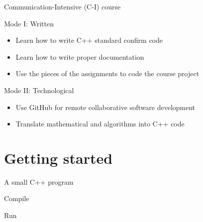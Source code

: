 \documentclass[\classoption]{beamer}
\begin{document}
\begin{frame}{Communication-Intensive (C-I) course}

\begin{block}{Mode I: Written}
\begin{itemize}
\item Learn how to write C++ standard confirm code 
\item Learn how to write proper documentation
\item Use the pieces of the assignments to code the course project
\end{itemize}
\end{block}

\begin{block}{Mode II: Technological}
\begin{itemize}
\item Use GitHub for remote collaborative software development
\item Translate mathematical and algorithms into C++ code 
\end{itemize}
\end{block}

\end{frame}



\section{Getting started}

\begin{frame}{A small C++ program}



\begin{block}{Compile}

\end{block}


\begin{block}{Run}

\end{block}


\end{frame}
\end{document}
